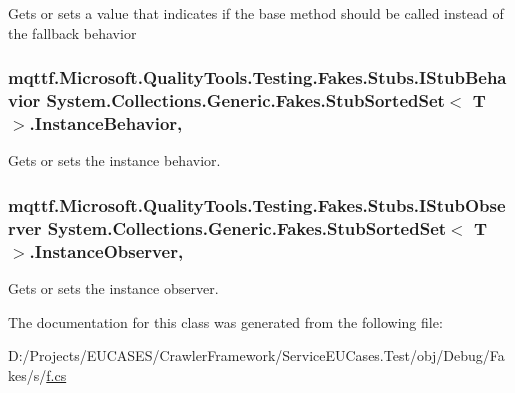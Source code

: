 Gets or sets a value that indicates if the base method should be called instead of the fallback behavior

\hypertarget{class_system_1_1_collections_1_1_generic_1_1_fakes_1_1_stub_sorted_set_3_01_t_01_4_a1057d7c681a148b59f181354fef18e13}{
\subsubsection[{Instance\-Behavior}]{\setlength{\rightskip}{0pt plus 5cm}mqttf.\-Microsoft.\-Quality\-Tools.\-Testing.\-Fakes.\-Stubs.\-I\-Stub\-Behavior System.\-Collections.\-Generic.\-Fakes.\-Stub\-Sorted\-Set$<$ T $>$.Instance\-Behavior\hspace{0.3cm}{\ttfamily [get]}, {\ttfamily [set]}}}\label{class_system_1_1_collections_1_1_generic_1_1_fakes_1_1_stub_sorted_set_3_01_t_01_4_a1057d7c681a148b59f181354fef18e13}


Gets or sets the instance behavior.

\hypertarget{class_system_1_1_collections_1_1_generic_1_1_fakes_1_1_stub_sorted_set_3_01_t_01_4_a0fb97ef60915f05323a9673afcae035c}{
\subsubsection[{Instance\-Observer}]{\setlength{\rightskip}{0pt plus 5cm}mqttf.\-Microsoft.\-Quality\-Tools.\-Testing.\-Fakes.\-Stubs.\-I\-Stub\-Observer System.\-Collections.\-Generic.\-Fakes.\-Stub\-Sorted\-Set$<$ T $>$.Instance\-Observer\hspace{0.3cm}{\ttfamily [get]}, {\ttfamily [set]}}}\label{class_system_1_1_collections_1_1_generic_1_1_fakes_1_1_stub_sorted_set_3_01_t_01_4_a0fb97ef60915f05323a9673afcae035c}


Gets or sets the instance observer.



The documentation for this class was generated from the following file\-:\begin{DoxyCompactItemize}
\item 
D\-:/\-Projects/\-E\-U\-C\-A\-S\-E\-S/\-Crawler\-Framework/\-Service\-E\-U\-Cases.\-Test/obj/\-Debug/\-Fakes/s/\hyperlink{s_2f_8cs}{f.\-cs}\end{DoxyCompactItemize}
